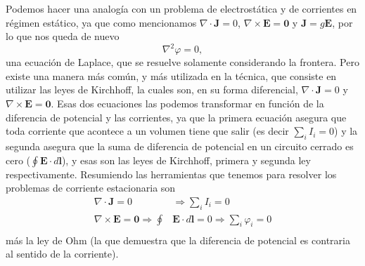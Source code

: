\documentclass[11pt,a4paper]{article}
\numberwithin{equation}{section}
\begin{document}
Podemos hacer una analogía con un problema de electrostática y de corrientes en régimen estático, ya que como mencionamos $\nabla \cdot \textbf{J} = 0$, $\nabla \times \textbf{E} = \textbf{0}$ y $\textbf{J} = g \textbf{E}$, por lo que nos queda de nuevo \[\nabla^2 \varphi = 0,\] una ecuación de Laplace, que se resuelve solamente considerando la frontera. Pero existe una manera más común, y más utilizada en la técnica, que consiste en utilizar las leyes de Kirchhoff, la cuales son, en su forma diferencial, $\nabla \cdot \textbf{J} = 0$ y $\nabla \times \textbf{E} = \textbf{0}$. Esas dos ecuaciones las podemos transformar en función de la diferencia de potencial y las corrientes, ya que la primera ecuación asegura que toda corriente que acontece a un volumen tiene que salir (es decir $\displaystyle \sum_i I_i = 0$) y la segunda asegura que la suma de diferencia de potencial en un circuito cerrado es cero ($\displaystyle \oint \textbf{E} \cdot d\textbf{l}$), y esas son las leyes de Kirchhoff, primera y segunda ley respectivamente. Resumiendo las herramientas que tenemos para resolver los problemas de corriente estacionaria son
\begin{align}
    \nabla \cdot \textbf{J} = 0 &\Rightarrow \sum_i I_i = 0\\
    \nabla \times \textbf{E} = \textbf{0} \Rightarrow \oint &\textbf{E} \cdot d\textbf{l} = 0 \Rightarrow \sum_i \varphi_i = 0\\
    \label{eq:corriente_kirchhoff}
\end{align}
más la ley de Ohm (la que demuestra que la diferencia de potencial es contraria al sentido de la corriente).
\end{document}
